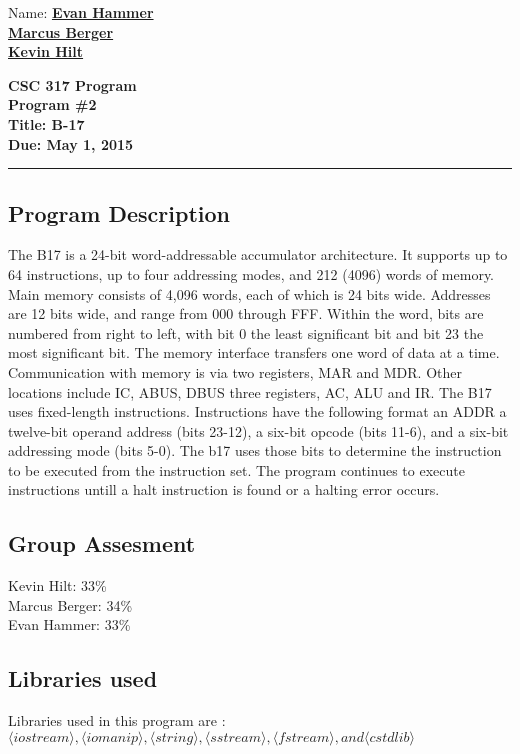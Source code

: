 \documentclass[11pt]{article}
\newcommand{\HWKtitle}[4]{\begin{center}
\textbf{#1\\Program #2\\Title: #3\\Due: #4}
\end{center}\medskip\hrule\bigskip}
\newcommand{\HWKname}[3]{\begin{flushright}
Name: \underline{\textbf{#1}}\\ \underline{\textbf{#2}}\\ \underline{\textbf{#3}}\end{flushright}}
\begin{document}
\HWKname{Evan Hammer}{Marcus Berger}{Kevin Hilt}  %

\HWKtitle{CSC 317 Program}{\#2}{B-17}{May 1, 2015}

\subsection{Program Description}
The B17 is a 24-bit word-addressable accumulator architecture.  It supports up to 64 instructions, up to four addressing modes, and 212 (4096) words of memory. Main memory consists of 4,096 words, each of which is 24 bits wide. Addresses are 12 bits wide, and range from 000 through FFF. Within the word, bits are numbered from right to left, with bit 0 the least significant bit and bit 23 the most significant bit. The memory interface transfers one word of data at a time. Communication with memory is via two registers, MAR and MDR. Other locations include IC, ABUS, DBUS three registers, AC, ALU and IR. The B17 uses fixed-length instructions. Instructions have the following format an ADDR a twelve-bit operand address (bits 23-12), a six-bit opcode (bits 11-6), and a six-bit addressing mode (bits 5-0). The b17 uses those bits to determine the instruction to be executed from the instruction set. The program continues to execute instructions untill a halt instruction is found or a halting error occurs.

\subsection{Group Assesment}
Kevin Hilt: 33\%\\
Marcus Berger: 34\%\\
Evan Hammer: 33\%\\

\subsection{Libraries used}
Libraries used in this program are :\\
$\langle iostream \rangle, \langle iomanip \rangle, \langle string \rangle, \langle sstream \rangle, \langle fstream \rangle, and \langle cstdlib \rangle$
\end{document}
